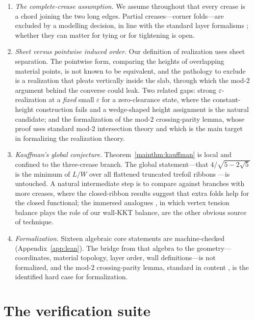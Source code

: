 \begin{enumerate}
\item\label{op:creases}\emph{The complete-crease assumption.} We assume throughout that every crease is a chord joining the two long edges. Partial creases---corner folds---are excluded by a modelling decision, in line with the standard layer formalisms \cite{justin1997,hull2002,demaine2007}; whether they can matter for tying or for tightening is open.

\item\label{op:order}\emph{Sheet versus pointwise induced order.} Our definition of realization uses sheet separation. The pointwise form, comparing the heights of overlapping material points, is not known to be equivalent, and the pathology to exclude is a realization that pleats vertically inside the slab, through which the mod-$2$ argument behind the converse could leak. Two related gaps: strong $\varepsilon$-realization at a \emph{fixed} small $\varepsilon$ for a zero-clearance state, where the constant-height construction fails and a wedge-shaped height assignment is the natural candidate; and the formalization of the mod-$2$ crossing-parity lemma, whose proof uses standard mod-$2$ intersection theory \cite{gp1974} and which is the main target in formalizing the realization theory.

\item\label{op:kauffman}\emph{Kauffman's global conjecture.} Theorem~\ref{mainthm:kauffman} is local and confined to the three-crease branch. The global statement---that $4/\sqrt{5-2\sqrt5}$ is the minimum of $L/W$ over all flattened truncated trefoil ribbons \cite{kauffman2004}---is untouched. A natural intermediate step is to compare against branches with more creases, where the closed-ribbon results suggest that extra folds help for the closed functional; the immersed analogues \cite{immersed2020,ayala2025}, in which vertex tension balance plays the role of our wall-KKT balance, are the other obvious source of technique.

\item\label{op:formal}\emph{Formalization.} Sixteen algebraic core statements are machine-checked (Appendix~\ref{app:lean}). The bridge from that algebra to the geometry---coordinates, material topology, layer order, wall definitions---is not formalized, and the mod-$2$ crossing-parity lemma, standard in content \cite{gp1974}, is the identified hard case for formalization.
\end{enumerate}

\appendix

\section{The verification suite}\label{app:suite}

